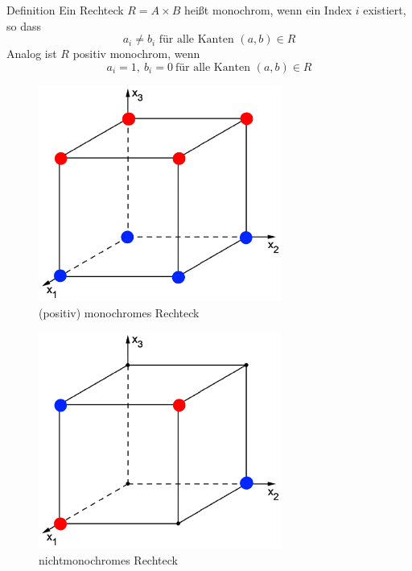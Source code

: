 \begin{frame}
    \begin{block}{Definition}
        Ein Rechteck $R = A\times B$ heißt monochrom, wenn ein Index $i$ existiert, so dass
        \newline
        \[ 
            a_i \neq b_i \text{ für alle Kanten } (a,b) \in R 
        \]
        Analog ist $R$ positiv monochrom, wenn
        \[
            a_i = 1,\ b_i = 0\ \text{für alle Kanten } (a,b) \in R
        \]
    \end{block}
\end{frame}

\begin{frame}
    \begin{figure}
        \centering
        \includegraphics[width=80mm,scale=0.5]{monochrom1.png}
        \caption{(positiv) monochromes Rechteck}
    \end{figure}
\end{frame}

\begin{frame}
    \begin{figure}
        \centering
        \includegraphics[width=80mm,scale=0.5]{monochrom2.png}
        \caption{nichtmonochromes Rechteck}
    \end{figure}
\end{frame}

